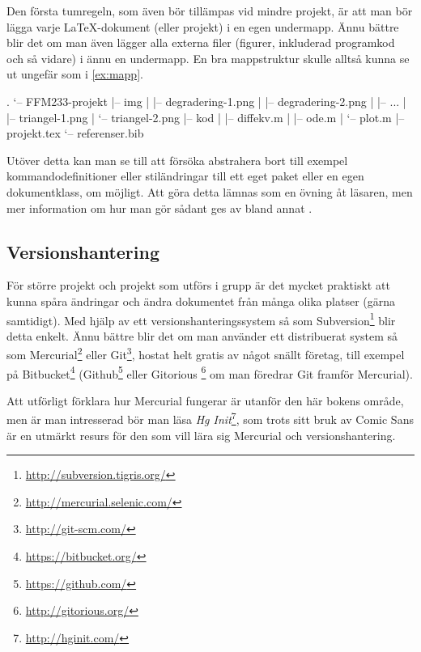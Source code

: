 \documentclass[10pt,../../a4.tex]{subfiles}
\begin{document}
Den första tumregeln, som även bör tillämpas vid mindre projekt, är att
man bör lägga varje \LaTeX-dokument (eller projekt) i en egen undermapp.
Ännu bättre blir det om man även lägger alla externa filer (figurer,
inkluderad programkod och så vidare) i ännu en undermapp. En bra
mappstruktur skulle alltså kunna se ut ungefär som i \cref{ex:mapp}.

\begin{kod}
	\begin{textcode}
.
`-- FFM233-projekt
|-- img
|   |-- degradering-1.png
|   |-- degradering-2.png
|   |-- ...
|   |-- triangel-1.png
|   `-- triangel-2.png
|-- kod
|   |-- diffekv.m
|   |-- ode.m
|   `-- plot.m
|-- projekt.tex
`-- referenser.bib
	\end{textcode}
	\caption{En bra mappstruktur för ett enkelt \LaTeX-projekt.}
	\label{ex:mapp}
\end{kod}

Utöver detta kan man se till att försöka abstrahera bort till exempel
kommandodefinitioner eller stiländringar till ett eget paket eller en
egen dokumentklass, om möjligt. Att göra detta lämnas som en övning åt
läsaren, men mer information om hur man gör sådant ges av bland annat
\textcites{Flynn06}{LaTeX3}{Robertson06}.

\subsection{Versionshantering}
För större projekt och projekt som utförs i grupp är det mycket praktiskt
att kunna spåra ändringar och ändra dokumentet från många olika platser
(gärna samtidigt). Med hjälp av ett versionshanteringssystem så som 
Subversion\footnote{\url{http://subversion.tigris.org/}} blir detta
enkelt. Ännu bättre blir det om man använder ett distribuerat system så
som Mercurial\footnote{\url{http://mercurial.selenic.com/}} eller
Git\footnote{\url{http://git-scm.com/}}, hostat helt gratis av något snällt
företag, till exempel på Bitbucket\footnote{\url{https://bitbucket.org/}}
(Github\footnote{\url{https://github.com/}} eller Gitorious%
\footnote{\url{http://gitorious.org/}} om man föredrar Git framför Mercurial).

Att utförligt förklara hur Mercurial fungerar är utanför den här bokens
område, men är man intresserad bör man läsa
\emph{Hg Init}\footnote{\url{http://hginit.com/}}, som trots sitt bruk av
Comic Sans är en utmärkt resurs för den som vill lära sig Mercurial och
versionshantering.
\end{document}

